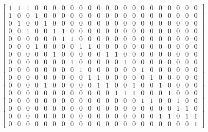 	\begin{equation}
		\begin{bmatrix} \label{eq:matrizInc}
			1 & 1 & 1 & 0 & 0 & 0 & 0 & 0 & 0 & 0 & 0 & 0 & 0 & 0 & 0 & 0 & 0 & 0 & 0 & 0 & 0 & 0  \\%
			1 & 0 & 0 & 1 & 0 & 0 & 0 & 0 & 0 & 0 & 0 & 0 & 0 & 0 & 0 & 0 & 0 & 0 & 0 & 0 & 0 & 0 \\%
			0 & 1 & 0 & 0 & 1 & 0 & 0 & 0 & 0 & 0 & 0 & 0 & 0 & 0 & 0 & 0 & 0 & 0 & 0 & 0 & 0 & 0 \\%
			0 & 0 & 1 & 0 & 0 & 1 & 1 & 0 & 0 & 0 & 0 & 0 & 0 & 0 & 0 & 0 & 0 & 0 & 0 & 0 & 0 & 0 \\%
			0 & 0 & 0 & 0 & 0 & 0 & 1 & 1 & 0 & 0 & 0 & 0 & 0 & 0 & 0 & 0 & 0 & 0 & 0 & 0 & 0 & 0 \\%
			0 & 0 & 0 & 1 & 0 & 0 & 0 & 0 & 1 & 1 & 0 & 0 & 0 & 0 & 0 & 0 & 0 & 0 & 0 & 0 & 0 & 0 \\%
			0 & 0 & 0 & 0 & 0 & 1 & 0 & 0 & 0 & 0 & 0 & 1 & 1 & 0 & 0 & 0 & 0 & 0 & 0 & 0 & 0 & 0 \\%
			0 & 0 & 0 & 0 & 0 & 0 & 0 & 1 & 0 & 0 & 0 & 0 & 0 & 1 & 0 & 0 & 0 & 0 & 0 & 0 & 0 & 0 \\%
			0 & 0 & 0 & 0 & 0 & 0 & 0 & 0 & 1 & 0 & 0 & 0 & 0 & 0 & 0 & 1 & 0 & 0 & 0 & 0 & 0 & 0 \\%
			0 & 0 & 0 & 0 & 0 & 0 & 0 & 0 & 0 & 1 & 1 & 0 & 0 & 0 & 0 & 0 & 1 & 0 & 0 & 0 & 0 & 0 \\%
			0 & 0 & 0 & 0 & 1 & 0 & 0 & 0 & 0 & 0 & 1 & 1 & 0 & 0 & 1 & 0 & 0 & 1 & 0 & 0 & 0 & 0 \\%
			0 & 0 & 0 & 0 & 0 & 0 & 0 & 0 & 0 & 0 & 0 & 0 & 1 & 1 & 1 & 0 & 0 & 0 & 1 & 0 & 0 & 0 \\%
			0 & 0 & 0 & 0 & 0 & 0 & 0 & 0 & 0 & 0 & 0 & 0 & 0 & 0 & 0 & 1 & 1 & 0 & 0 & 1 & 0 & 0 \\%
			0 & 0 & 0 & 0 & 0 & 0 & 0 & 0 & 0 & 0 & 0 & 0 & 0 & 0 & 0 & 0 & 0 & 0 & 0 & 1 & 1 & 0 \\%
			0 & 0 & 0 & 0 & 0 & 0 & 0 & 0 & 0 & 0 & 0 & 0 & 0 & 0 & 0 & 0 & 0 & 1 & 1 & 0 & 1 & 1 \\%
			0 & 0 & 0 & 0 & 0 & 0 & 0 & 0 & 0 & 0 & 0 & 0 & 0 & 0 & 0 & 0 & 0 & 0 & 0 & 0 & 0 & 1 %
		\end{bmatrix}
	\end{equation}
	
	
